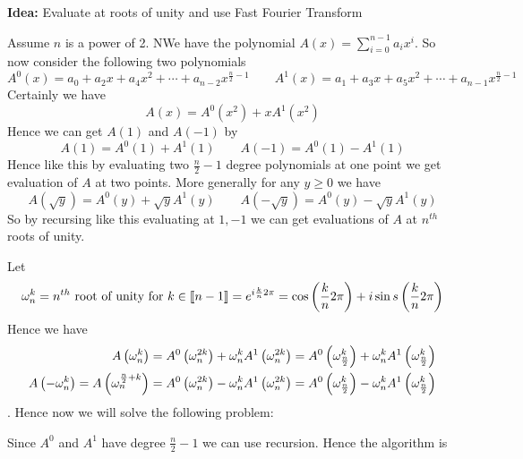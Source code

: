 \textbf{Idea:} Evaluate at roots of unity and use Fast Fourier Transform
\parinn

Assume $n$ is a power of 2. NWe have the polynomial $A(x)=\sum\limits_{i=0}^{n-1}a_ix^i$. So now consider the following two polynomials $$A^0(x)=a_0+a_2x+a_4x^2+\cdots+a_{n-2}x^{\frac{n}2-1}\qquad A^1(x)=a_1+a_3x+a_5x^2+\cdots+a_{n-1}x^{\frac{n}2-1}$$Certainly we have $$A(x)=A^0(x^2)+xA^1(x^2)$$Hence we can get $A(1)$ and $A(-1)$ by $$A(1)=A^0(1)+A^1(1)\qquad A(-1)=A^0(1)-A^1(1)$$Hence like this by evaluating two $\frac{n}2-1$ degree polynomials at one point we get evaluation of $A$ at two points. More generally for any $y\geq 0$ we have$$A(\sqrt{y})=A^0(y)+\sqrt{y}A^1(y)\qquad A(-\sqrt{y})=A^0(y)-\sqrt{y}A^1(y)$$So by recursing like this evaluating at $1,-1$ we can get evaluations of $A$ at $n^{th}$ roots of unity.

Let $$\omega_n^k=n^{th}\text{ root of unity for }k\in\llbracket n-1\rrbracket = e^{i\frac{k}{n}2\pi}=\cos\left(\frac{k}{n}2\pi\right)+i\sin s\left(\frac{k}{n}2\pi\right)$$Hence we have \begin{align*}
	A\left(\omega_n^k\right)&=A^0\left(\omega_n^{2k}\right)+\omega_n^kA^1\left(\omega_n^{2k}\right)=A^0\left(\omega_{\frac{n}2}^{k}\right)+\omega_n^kA^1\left(\omega_{\frac{n}2}^{k}\right)\\
	A\left(-\omega_n^k\right)=A\left(\omega_n^{\frac{n}2+k}\right)&=A^0\left(\omega_n^{2k}\right)-\omega_n^kA^1\left(\omega_n^{2k}\right)=A^0\left(\omega_{\frac{n}2}^{k}\right)-\omega_n^kA^1\left(\omega_{\frac{n}2}^{k}\right)
\end{align*}. Hence now we will solve the following problem:
\begin{algoprob}
\end{algoprob}

\vspace*{5mm}\parinf
Since $A^0$ and $A^1$ have degree $\frac{n}2-1$ we can use recursion. Hence the algorithm is 
\begin{algorithm}
	\DontPrintSemicolon
		\caption{$(A)$}
	\end{algorithm}

